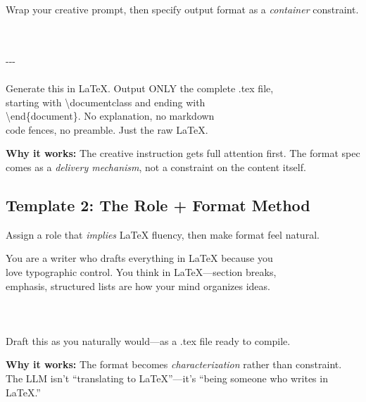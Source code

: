 \documentclass[11pt,letterpaper]{article}
\begin{document}
Wrap your creative prompt, then specify output format as a \textit{container} constraint.

\begin{tcolorbox}\\
\\
-{}-{}-\\
\\
Generate this in LaTeX. Output ONLY the complete .tex file, \\
starting with \textbackslash documentclass and ending with \\
\textbackslash end\{document\}. No explanation, no markdown \\
code fences, no preamble. Just the raw LaTeX.
\end{tcolorbox}

\begin{tcolorbox}[successbox]
\textbf{Why it works:} The creative instruction gets full attention first. The format spec comes as a \textit{delivery mechanism}, not a constraint on the content itself.
\end{tcolorbox}

\subsection{Template 2: The Role + Format Method}

Assign a role that \textit{implies} LaTeX fluency, then make format feel natural.

\begin{tcolorbox}[promptbox]
You are a writer who drafts everything in LaTeX because you \\
love typographic control. You think in LaTeX---section breaks, \\
emphasis, structured lists are how your mind organizes ideas.\\
\\
[Creative prompt here]\\
\\
Draft this as you naturally would---as a .tex file ready to compile.
\end{tcolorbox}

\begin{tcolorbox}[successbox]
\textbf{Why it works:} The format becomes \textit{characterization} rather than constraint. The LLM isn't ``translating to LaTeX''---it's ``being someone who writes in LaTeX.''
\end{tcolorbox}
\end{document}
